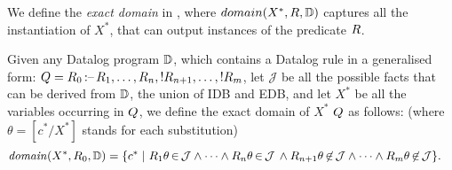 \documentclass[acmsmall,screen,review,anonymous,nonacm]{acmart}
\begin{document}
We define the \emph{exact domain} in , where $domain(X^*, R, \mathbb{D})$ captures all the instantiation of $X^*$, that can output instances of the predicate $R$. 

\begin{definition}
\label{def:exact_domain}
Given any Datalog program $\mathbb{D}$, which contains a  
Datalog rule in a generalised form: $Q=R_0{\,\text{:--}\,}R_1,\dots,R_n, 
!R_{n+1}, \dots, !R_m$, 
let $\mathcal{J}$ be all the possible facts that can be derived from $\mathbb{D}$, \ie  the union of IDB and EDB, and let $X^*$ be all the variables occurring in $Q$, we define the exact domain of $X^*$ \wrt $Q$ as follows: (where $\theta{=}[c^*/X^*]$ stands for each substitution)
\begin{align*}
\mathit{domain}(X^*, R_0, \mathbb{D}) =
\{c^* \mid~  & 
R_1\theta{\,\in\,}\mathcal{J} \wedge \dots \wedge 
R_n\theta{\,\in\,}\mathcal{J} \,\wedge  
R_{n{+}1}\theta{\,\not\in\,}\mathcal{J} 
\wedge \dots \wedge 
R_m\theta{\,\not\in\,}\mathcal{J}\}. 
\end{align*}
\end{definition}
\end{document}
